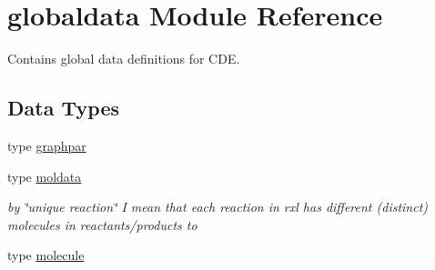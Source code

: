 \hypertarget{namespaceglobaldata}{}\section{globaldata Module Reference}
\label{namespaceglobaldata}


Contains global data definitions for C\+DE.  


\subsection*{Data Types}
\begin{DoxyCompactItemize}
\item 
type \mbox{\hyperlink{structglobaldata_1_1graphpar}{graphpar}}
\item 
type \mbox{\hyperlink{structglobaldata_1_1moldata}{moldata}}
\begin{DoxyCompactList}\small\item\em by \char`\"{}unique reaction\char`\"{} I mean that each reaction in rxl has different (distinct) molecules in reactants/products to \end{DoxyCompactList}\item 
type \mbox{\hyperlink{structglobaldata_1_1molecule}{molecule}}
\end{DoxyCompactItemize}
